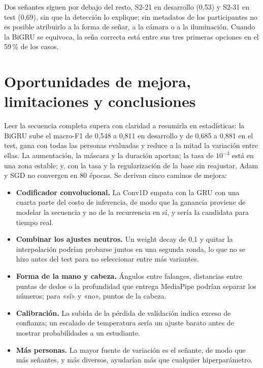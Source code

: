 \documentclass[11pt,a4paper]{article}
\begin{document}
Dos señantes siguen por debajo del resto, S2-21 en desarrollo (0,53) y S2-31 en test (0,69), sin que la detección lo explique; sin metadatos de los participantes no es posible atribuirlo a la forma de señar, a la cámara o a la iluminación. Cuando la BiGRU se equivoca, la seña correcta está entre sus tres primeras opciones en el 59\,\% de los casos.

\section{Oportunidades de mejora, limitaciones y conclusiones}

Leer la secuencia completa supera con claridad a resumirla en estadísticas: la BiGRU sube el macro-F1 de 0,548 a 0,811 en desarrollo y de 0,685 a 0,881 en el test, gana con todas las personas evaluadas y reduce a la mitad la variación entre ellas. La aumentación, la máscara y la duración aportan; la tasa de $10^{-3}$ está en una zona estable; y, con la tasa y la regularización de la base sin reajustar, Adam y SGD no convergen en 80 épocas. Se derivan cinco caminos de mejora:

\begin{itemize}
\item \textbf{Codificador convolucional.} La Conv1D empata con la GRU con una cuarta parte del costo de inferencia, de modo que la ganancia proviene de modelar la secuencia y no de la recurrencia en sí, y sería la candidata para tiempo real.
\item \textbf{Combinar los ajustes neutros.} Un weight decay de 0,1 y quitar la interpolación podrían probarse juntos en una segunda ronda, lo que no se hizo antes del test para no seleccionar entre más variantes.
\item \textbf{Forma de la mano y cabeza.} Ángulos entre falanges, distancias entre puntas de dedos o la profundidad que entrega MediaPipe podrían separar los números; para «sí» y «no», puntos de la cabeza.
\item \textbf{Calibración.} La subida de la pérdida de validación indica exceso de confianza; un escalado de temperatura sería un ajuste barato antes de mostrar probabilidades a un estudiante.
\item \textbf{Más personas.} La mayor fuente de variación es el señante, de modo que más señantes, y más diversos, ayudarían más que cualquier hiperparámetro.
\end{itemize}
\end{document}
